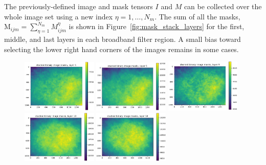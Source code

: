 \documentclass[letterpaper,11pt]{article}
\newcommand{\reffig}[1]{Figure~\ref{#1}}
\newcommand{\Mu}{\mathrm{M}}
\begin{document}
The previously-defined image and mask tensors $I$ and $M$ can be collected over the whole image set using a new index $\eta=1,\ldots,N_{m}$. The sum of all the masks, $\Mu_{ijm} = \sum_{\eta=1}^{N_{m}} M^{\eta}_{ijm}$ is shown in \reffig{fig:mask_stack_layers} for the first, middle, and last layers in each broadband filter region. A small bias toward selecting the lower right hand corners of the images remains in some cases. 

\begin{figure}[!ht]
\centering
\includegraphics[width=0.32\textwidth]{images/measuring_flatfield_corrections/mask_stack_layers/mask_stack_layer_1}
\includegraphics[width=0.32\textwidth]{images/measuring_flatfield_corrections/mask_stack_layers/mask_stack_layer_5}
\includegraphics[width=0.32\textwidth]{images/measuring_flatfield_corrections/mask_stack_layers/mask_stack_layer_9}
\includegraphics[width=0.32\textwidth]{images/measuring_flatfield_corrections/mask_stack_layers/mask_stack_layer_10}
\includegraphics[width=0.32\textwidth]{images/measuring_flatfield_corrections/mask_stack_layers/mask_stack_layer_14}

\end{figure}
\end{document}
